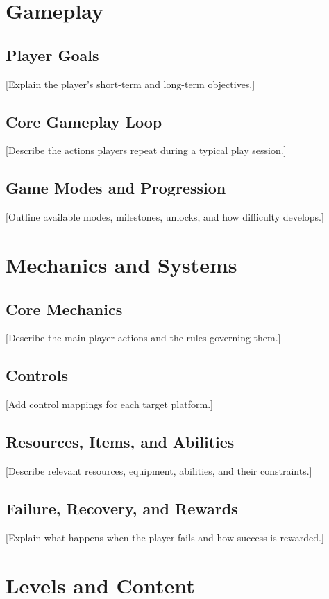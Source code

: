 \documentclass[11pt,a4paper]{article}
\begin{document}
\section{Gameplay}
\subsection{Player Goals}
[Explain the player's short-term and long-term objectives.]

\subsection{Core Gameplay Loop}
[Describe the actions players repeat during a typical play session.]

\subsection{Game Modes and Progression}
[Outline available modes, milestones, unlocks, and how difficulty develops.]

\section{Mechanics and Systems}
\subsection{Core Mechanics}
[Describe the main player actions and the rules governing them.]

\subsection{Controls}
[Add control mappings for each target platform.]

\subsection{Resources, Items, and Abilities}
[Describe relevant resources, equipment, abilities, and their constraints.]

\subsection{Failure, Recovery, and Rewards}
[Explain what happens when the player fails and how success is rewarded.]

\section{Levels and Content}
\end{document}
